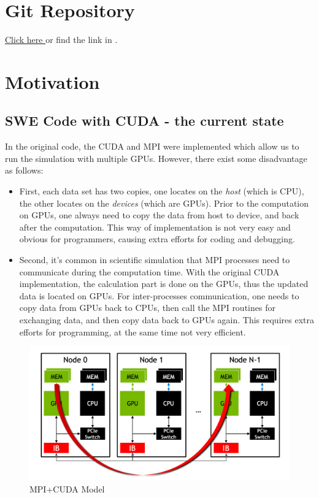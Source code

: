 \documentclass[article]{scrartcl}
\begin{document}
\maketitle
\thispagestyle{fancy}

\section{Git Repository}

\href{https://gitlab.lrz.de/phuongng_tum/hpclab}{Click here } or find the link in \cite{gitrepo}.
\section{Motivation}
\subsection{SWE Code with CUDA - the current state}


In the original code, the CUDA and MPI were implemented which allow us to run the simulation with multiple GPUs. However, there exist some disadvantage as follows:
\begin{itemize}
	\item First, each data set has two copies, one locates on the \textit{host} (which is CPU), the other locates on the \textit{devices} (which are GPUs). Prior to the computation on GPUs, one always need to copy the data from host to device, and back after the computation. This way of implementation is not very easy and obvious for programmers, causing extra efforts for coding and debugging.
	\item Second, it's common in scientific simulation that MPI processes need to communicate during the computation time. With the original CUDA implementation, the calculation part is done on the GPUs, thus the updated data is located on GPUs. For inter-processes communication, one needs to copy data from GPUs back to CPUs, then call the MPI routines for exchanging data, and then copy data back to GPUs again. This requires extra efforts for programming, at the same time not very efficient.
\end{itemize}
\begin{figure}[htpb]
	\centering
	\includegraphics[width=.8\textwidth,height=.8\textheight,keepaspectratio=true]{../figs/mpi+cuda.png}
	\caption{MPI+CUDA Model}
	\label{fig:mpi+cuda}
\end{figure}
\end{document}
